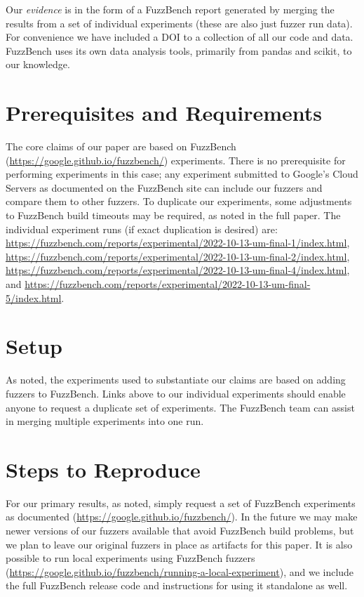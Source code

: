\documentclass[manuscript,screen,review]{acmart}
\begin{document}
Our \emph{evidence} is in the form of a FuzzBench report generated by merging
the results from a set of individual experiments (these are also just
fuzzer run data).  For convenience we
have included a DOI to a collection of all our code and data.  FuzzBench uses its own
data analysis tools, primarily from pandas and scikit, to our knowledge.
  
\section{Prerequisites and Requirements}


The core claims of our paper are based on FuzzBench
\cite{metzman2021fuzzbench}
(\url{https://google.github.io/fuzzbench/}) experiments.  There is no
prerequisite for performing experiments in this case; any experiment
submitted to Google's Cloud Servers as documented on the FuzzBench site
can include our fuzzers and compare them to other fuzzers.
To duplicate our experiments, some adjustments to FuzzBench build
timeouts may be required, as noted in the full paper.  The individual experiment
runs (if exact duplication is desired) are: \url{https://fuzzbench.com/reports/experimental/2022-10-13-um-final-1/index.html}, \url{https://fuzzbench.com/reports/experimental/2022-10-13-um-final-2/index.html}, \url{https://fuzzbench.com/reports/experimental/2022-10-13-um-final-4/index.html}, and \url{https://fuzzbench.com/reports/experimental/2022-10-13-um-final-5/index.html}.

\section{Setup}

As noted, the experiments used to substantiate our claims are based on
adding fuzzers to FuzzBench.  Links above to our individual
experiments should enable anyone to request a duplicate set of
experiments.  The FuzzBench team can assist in merging multiple
experiments into one run.

\section{Steps to Reproduce}

For our primary results, as noted, simply request a set of FuzzBench
experiments as documented
(\url{https://google.github.io/fuzzbench/}).  In the future we may
make newer versions of our fuzzers available that avoid FuzzBench
build problems, but we plan to leave our original fuzzers in place as
artifacts for this paper.  It is also possible to run local
experiments using FuzzBench fuzzers
(\url{https://google.github.io/fuzzbench/running-a-local-experiment}),
and we include the full FuzzBench release code and instructions for
using it standalone as well.




\end{document}
